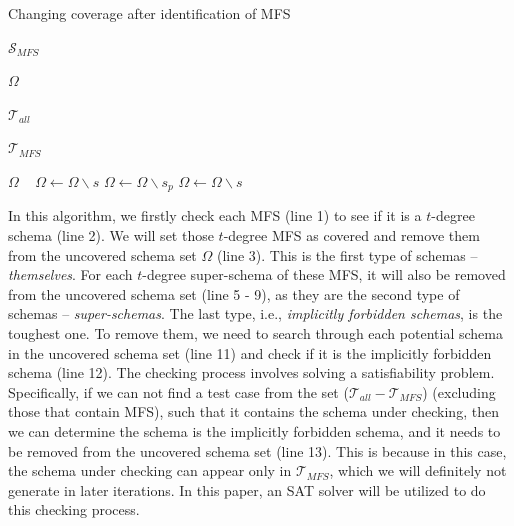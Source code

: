 \documentclass[journal,12pt,onecolumn,draftclsnofoot,]{IEEEtran}
\begin{document}
\begin{algorithm}
  \caption{Changing coverage after identification of MFS}
  \begin{algorithmic}[1]
     \Require



     $\mathcal{S}_{MFS}$ 

     $\Omega$ 


     $\mathcal{T}_{all}$ 

     $\mathcal{T}_{MFS}$ 

\Ensure  $\Omega$ 
\
          \State $\Omega \leftarrow \Omega \backslash s$
       \EndIf
          \State $\Omega \leftarrow \Omega \backslash s_{p}$
         \EndIf
       \EndFor
     \EndFor
         \State  $\Omega \leftarrow \Omega \backslash s$
       \EndIf
     \EndFor
  \end{algorithmic}
\end{algorithm}

 In this algorithm, we firstly check each MFS (line 1) to see if it is a $t$-degree schema (line 2). We will set those $t$-degree MFS as covered and remove them from the uncovered schema set $\Omega$ (line 3). This is the first type of schemas --\emph{themselves}. For each $t$-degree super-schema of these MFS, it will also be removed from the uncovered schema set (line 5 - 9), as they are the second type of schemas --  \emph{super-schemas}. The last type, i.e., \emph{implicitly forbidden schemas}, is the toughest one. To remove them, we need to search through each potential schema in the uncovered schema set (line 11) and check if it is the implicitly forbidden schema (line 12). The checking process involves solving a satisfiability problem. Specifically, if we can not find a test case from  the set ($\mathcal{T}_{all} - \mathcal{T}_{MFS}$) (excluding those that contain MFS), such that it contains the schema under checking, then we can determine the schema is the implicitly forbidden schema, and it needs to be removed from the uncovered schema set (line 13). This is because in this case, the schema under checking can appear only in $\mathcal{T}_{MFS}$, which we will definitely not generate in later iterations.
 In this paper, an SAT solver will be utilized to do this checking process.
\end{document}
